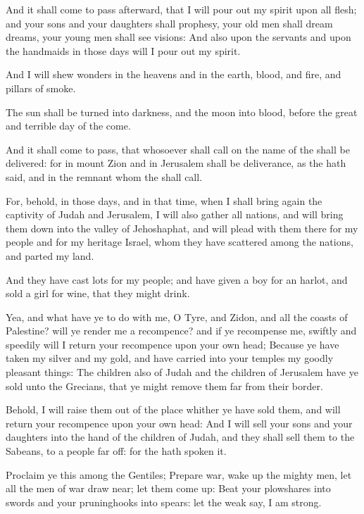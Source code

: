 \Verse And it shall come to pass afterward, that I will pour out my spirit upon all flesh; and your sons and your daughters shall prophesy, your old men shall dream dreams, your young men shall see visions: \Verse And also upon the servants and upon the handmaids in those days will I pour out my spirit.

\Verse And I will shew wonders in the heavens and in the earth, blood, and fire, and pillars of smoke.

\Verse The sun shall be turned into darkness, and the moon into blood, before the great and terrible day of the \LORD come.

\Verse And it shall come to pass, that whosoever shall call on the name of the \LORD shall be delivered: for in mount Zion and in Jerusalem shall be deliverance, as the \LORD hath said, and in the remnant whom the \LORD shall call.


\Chapter
\Verse For, behold, in those days, and in that time, when I shall bring again the captivity of Judah and Jerusalem, \Verse I will also gather all nations, and will bring them down into the valley of Jehoshaphat, and will plead with them there for my people and for my heritage Israel, whom they have scattered among the nations, and parted my land.

\Verse And they have cast lots for my people; and have given a boy for an harlot, and sold a girl for wine, that they might drink.

\Verse Yea, and what have ye to do with me, O Tyre, and Zidon, and all the coasts of Palestine? will ye render me a recompence? and if ye recompense me, swiftly and speedily will I return your recompence upon your own head; \Verse Because ye have taken my silver and my gold, and have carried into your temples my goodly pleasant things: \Verse The children also of Judah and the children of Jerusalem have ye sold unto the Grecians, that ye might remove them far from their border.

\Verse Behold, I will raise them out of the place whither ye have sold them, and will return your recompence upon your own head: \Verse And I will sell your sons and your daughters into the hand of the children of Judah, and they shall sell them to the Sabeans, to a people far off: for the \LORD hath spoken it.

\Verse Proclaim ye this among the Gentiles; Prepare war, wake up the mighty men, let all the men of war draw near; let them come up: \Verse Beat your plowshares into swords and your pruninghooks into spears: let the weak say, I am strong.

